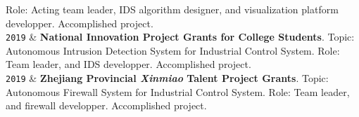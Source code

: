 \documentclass[9pt,a4paper]{article}
\newcommand{\Year}[1]{\fontsize{10pt}{0}\selectfont \texttt{#1}}
\begin{document}
\begin{EntriesTableYear}
    \newline
    Role: Acting team leader, IDS algorithm designer, and visualization platform developper.
    \newline
    Accomplished project. 
  \\
  \Year{2019} & 
    \textbf{National Innovation Project Grants for College Students}.
    \newline
    Topic: Autonomous Intrusion Detection System for Industrial Control System.
    \newline
    Role: Team leader, and IDS developper.
    \newline
    Accomplished project. 
  \\
  \Year{2019} & 
    \textbf{Zhejiang Provincial \emph{Xinmiao} Talent Project Grants}.
    \newline
    Topic: Autonomous Firewall System for Industrial Control System.
    \newline
    Role: Team leader, and firewall developper.
    \newline
    Accomplished project. 
\end{EntriesTableYear}
\end{document}
